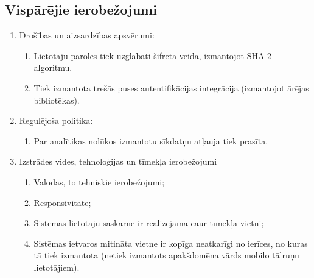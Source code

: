 \subsection{Vispārējie ierobežojumi}

\begin{enumerate}
	\item Drošības un aizsardzības apsvērumi:
	      \begin{enumerate}
		      \item Lietotāju paroles tiek uzglabāti šifrētā veidā, izmantojot SHA-2 algoritmu.
		      \item Tiek izmantota trešās puses autentifikācijas integrācija (izmantojot ārējas bibliotēkas).
	      \end{enumerate}
	\item Regulējoša politika:
	      \begin{enumerate}
		      \item Par analītikas nolūkos izmantotu sīkdatņu atļauja tiek prasīta.
	      \end{enumerate}
	\item Izstrādes vides, tehnoloģijas un tīmekļa ierobežojumi
	      \begin{enumerate}
		      \item Valodas, to tehniskie ierobežojumi;
		      \item Responsivitāte;
		      \item Sistēmas lietotāju saskarne ir realizējama caur tīmekļa vietni;
		      \item Sistēmas ietvaros mitināta vietne ir kopīga neatkarīgi no ierīces, no kuras tā tiek izmantota (netiek izmantots apakšdomēna vārds mobilo tālruņu lietotājiem).
	      \end{enumerate}
\end{enumerate}



